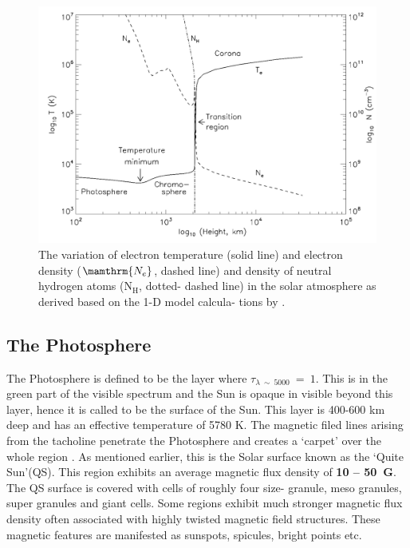 \begin{figure}[h!]
    \centering
    \includegraphics[width = 0.8\linewidth]{Figures/solar_atm.png}
    \caption{The variation of electron temperature (solid line) and electron density ($\mamthrm{N_{e}}$, dashed line) and density of neutral hydrogen atoms ($\mathrm{N_{H}}$, dotted- dashed line) in the solar atmosphere as derived based on the 1-D model calcula- tions by .}
    \label{fig_solar_atm}
\end{figure}

\subsection{The Photosphere}\label{photosphere}

The Photosphere is defined to be the layer where $\tau_{\lambda~\sim~5000}~=~1$. This is in the green part of the visible spectrum and the Sun is opaque in visible beyond this layer, hence it is called to be the surface of the Sun. This layer is 400-600 km deep and has an effective temperature of 5780 K. The magnetic filed lines arising from the tacholine penetrate the Photosphere and creates a `carpet' over the whole region \citep{priest14}. As mentioned earlier, this is the Solar surface known as the `Quite Sun'(QS). This region exhibits an average magnetic flux density of \textbf{10 -- 50~G}. The QS surface is covered with cells of roughly four size- granule, meso granules, super granules and giant cells. Some regions exhibit much stronger magnetic flux density often associated with highly twisted magnetic field structures. These magnetic features are manifested as sunspots, spicules, bright points etc. 

